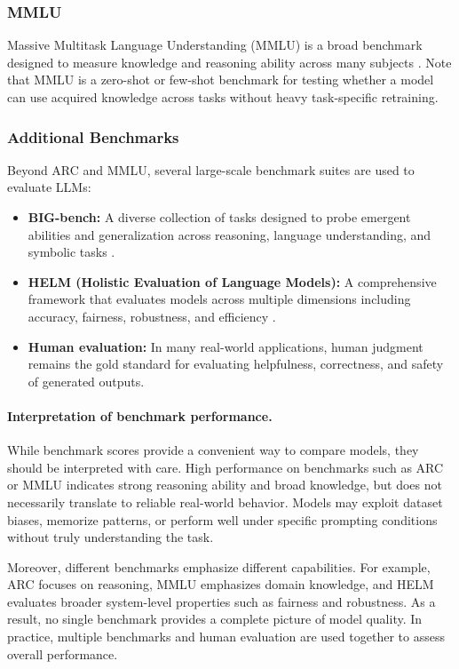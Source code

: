 \documentclass{article}
\begin{document}
\subsubsection{MMLU}
Massive Multitask Language Understanding (MMLU) is a broad benchmark designed to measure knowledge and reasoning ability across many subjects \cite{hendrycks2021mmlu}. Note that MMLU is a zero-shot or few-shot benchmark for testing whether a model can use acquired knowledge across tasks without heavy task-specific retraining.

\subsubsection{Additional Benchmarks}

Beyond ARC and MMLU, several large-scale benchmark suites are used to evaluate LLMs:

\begin{itemize}
    \item \textbf{BIG-bench:} A diverse collection of tasks designed to probe emergent abilities and generalization across reasoning, language understanding, and symbolic tasks \cite{srivastava2023bigbench}.
    \item \textbf{HELM (Holistic Evaluation of Language Models):} A comprehensive framework that evaluates models across multiple dimensions including accuracy, fairness, robustness, and efficiency \cite{liang2023helm}.
    \item \textbf{Human evaluation:} In many real-world applications, human judgment remains the gold standard for evaluating helpfulness, correctness, and safety of generated outputs.
\end{itemize}

\paragraph{Interpretation of benchmark performance.}
While benchmark scores provide a convenient way to compare models, they should be interpreted with care. High performance on benchmarks such as ARC or MMLU indicates strong reasoning ability and broad knowledge, but does not necessarily translate to reliable real-world behavior. Models may exploit dataset biases, memorize patterns, or perform well under specific prompting conditions without truly understanding the task.

Moreover, different benchmarks emphasize different capabilities. For example, ARC focuses on reasoning, MMLU emphasizes domain knowledge, and HELM evaluates broader system-level properties such as fairness and robustness. As a result, no single benchmark provides a complete picture of model quality. In practice, multiple benchmarks and human evaluation are used together to assess overall performance.
\end{document}
